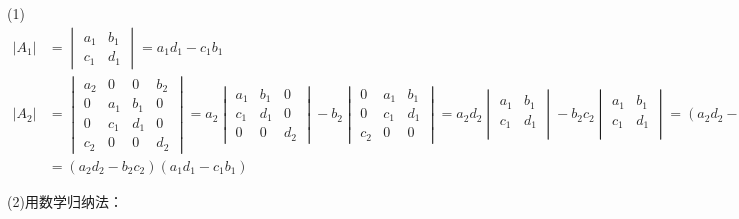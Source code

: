 \documentclass{article}
\begin{document}
\begin{jie}
(1)
\begin{align*}
|A_{1}|&=
\begin{vmatrix}
  a_{1} & b_{1} \\
  c_{1} & d_{1}
\end{vmatrix}=a_{1}d_{1}-c_{1}b_{1}\\
|A_{2}|&=\begin{vmatrix}
a_{2}& 0& 0&b_{2}\\
0&  a_{1} & b_{1}& 0 \\
0&  c_{1} & d_{1}& 0\\
c_{2}& 0& 0&d_{2}
\end{vmatrix}=a_{2}\begin{vmatrix}
  a_{1} & b_{1}& 0 \\
  c_{1} & d_{1}& 0\\
 0& 0&d_{2}
\end{vmatrix}-b_{2}
\begin{vmatrix}
0&  a_{1} & b_{1} \\
0&  c_{1} & d_{1}\\
c_{2}& 0& 0
\end{vmatrix}=a_{2}d_{2}
\begin{vmatrix}
  a_{1} & b_{1}\\
  c_{1} & d_{1}\\
\end{vmatrix}-b_{2}c_{2}\begin{vmatrix}
  a_{1} & b_{1}\\
  c_{1} & d_{1}\\
\end{vmatrix}=(a_{2}d_{2}-b_{2}c_{2})|A_{1}|\\
&=(a_{2}d_{2}-b_{2}c_{2})(a_{1}d_{1}-c_{1}b_{1})
\end{align*}

(2)用数学归纳法：


\end{jie}
\end{document}
